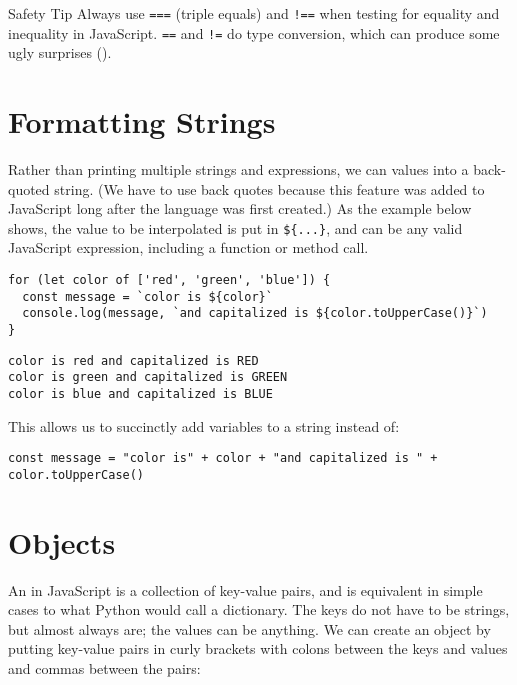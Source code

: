 \begin{aside}{Safety Tip}
  Always use \texttt{===} (triple equals) and \texttt{!==} when testing for equality and inequality in JavaScript.
  \texttt{==} and \texttt{!=} do type conversion,
  which can produce some ugly surprises ().
\end{aside}

\section{Formatting Strings}\label{s:basics-formatting}

Rather than printing multiple strings and expressions,
we can  values into a back-quoted string.
(We have to use back quotes because this feature was added to JavaScript
long after the language was first created.)
As the example below shows,
the value to be interpolated is put in \texttt{\$\{...\}},
and can be any valid JavaScript expression,
including a function or method call.

\begin{verbatim}
for (let color of ['red', 'green', 'blue']) {
  const message = `color is ${color}`
  console.log(message, `and capitalized is ${color.toUpperCase()}`)
}
\end{verbatim}

\begin{verbatim}
color is red and capitalized is RED
color is green and capitalized is GREEN
color is blue and capitalized is BLUE
\end{verbatim}

\noindent
This allows us to succinctly add variables to a string instead of:

\begin{verbatim}
const message = "color is" + color + "and capitalized is " + color.toUpperCase()
\end{verbatim}

\section{Objects}\label{s:basics-objects}

An  in JavaScript is a collection of key-value pairs,
and is equivalent in simple cases to what Python would call a dictionary.
The keys do not have to be strings,
but almost always are;
the values can be anything.
We can create an object by putting key-value pairs in curly brackets
with colons between the keys and values
and commas between the pairs:


